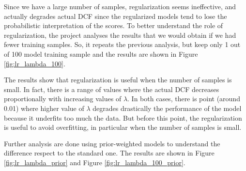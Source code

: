 \documentclass{article}
\begin{document}
Since we have a large number of samples, regularization seems ineffective, and actually degrades actual DCF since the regularized models tend to lose the probabilistic interpretation of the scores. To better understand the role of regularization, the project analyses the results that we would obtain if we had fewer training samples. So, it repeats the previous analysis, but keep only 1 out of 100 model training sample and the results are shown in Figure \ref{fig:lr_lambda_100}.

The results show that regularization is useful when the number of samples is small. In fact, there is a range of values where the actual DCF decreases proportionally with increasing values of $\lambda$. In both cases, there is point (around 0.01) where higher value of $\lambda$ degrades drastically the performance of the model because it underfits too much the data. But before this point, the regularization is useful to avoid overfitting, in particular when the number of samples is small.

Further analysis are done using prior-weighted models to understand the difference respect to the standard one. The results are shown in Figure \ref{fig:lr_lambda_prior} and Figure \ref{fig:lr_lambda_100_prior}.
\end{document}
